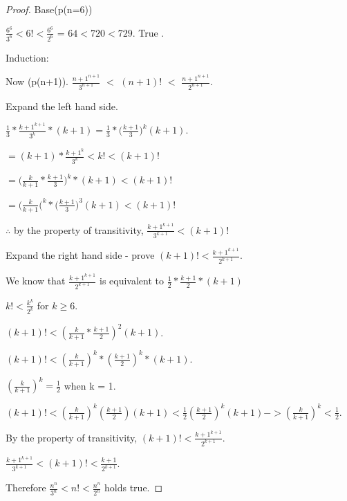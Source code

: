 \documentclass[10 pt]{article}
\begin{document}
\begin{multicols}{2}
\begin{proof} Base(p(n=6))

$\frac{6^6}{3^6} < 6! < \frac{6^6}{2^6}$ 
= $64 < 720 < 729$.
True \checkmark.

Induction:

Now (p(n+1)). $\frac{n+1^{n+1}}{3^{n+1}}$ $<$ $(n+1)!$ $<$ $\frac{n+1^{n+1}}{2^{n+1}}$.

Expand the left hand side.

$\frac{1}{3} * \frac{k+1^{k+1}}{3^k} * (k+1)
= \frac{1}{3}*\big( \frac{k+1}{3} \big) ^k (k+1)$. 

$=(k+1)*\frac{k+1^k}{3^k} < k! < (k+1)!$

$=\big(\frac{k}{k+1} * \frac{k+1}{3}\big) ^k * (k+1) < (k+1)!$

$=\big( \frac{k}{k+1} \big(^k * \big(\frac{k+1}{3}\big)^3 (k+1) < (k+1)!$

$\therefore$ by the property of transitivity, $\frac{k+1^{k+1}}{3^{k+1}} < (k+1)!$

\vspace{10pt}
Expand the right hand side - prove $(k+1)!< \frac{k+1^{k+1}}{2^{k+1}}$.

We know that $\frac{k+1^{k+1}}{2^{k+1}}$ is equivalent to $\frac{1}{2} * \frac{k+1}{2} * (k+1)$

$k! < \frac{k^k}{2^k}$ for $k \geq 6$.


$(k+1)! < (\frac{k}{k+1} * \frac{k+1}{2})^2 (k+1)$.

$(k+1)! < (\frac{k}{k+1})^k * (\frac{k+1}{2})^k * (k+1)$.

$(\frac{k}{k+1})^k = \frac{1}{2}$ when k = 1.


$(k+1)! < (\frac{k}{k+1})^k (\frac{k+1}{2}) (k+1) < \frac{1}{2} (\frac{k+1}{2})^k (k+1)  -> (\frac{k}{k+1})^k < \frac{1}{2}$.


By the property of transitivity, $(k+1)! < \frac{k+1^{k+1}}{2^{k+1}}$.

$\frac{k+1^{k+1}}{3^{k+1}} < (k+1)! < \frac{k+1}{2^{k+1}}$.

Therefore $\frac{n^n}{3^n} < n! < \frac{n^n}{2^n}$ holds true.

\end{proof}
\end{multicols}
\begin{comment}
\section{Left to study}

DFS VS BFS

Bellman vs Dijkstra

Dynamic Programming

big o cheat sheet
\end{comment}
\end{document}
